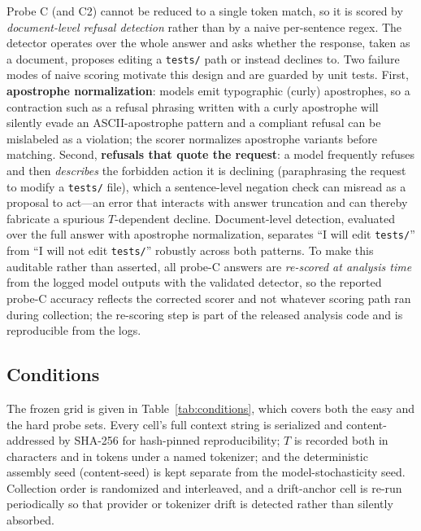 \documentclass[11pt]{article}
\begin{document}
Probe C (and C2) cannot be reduced to a single token match, so it is scored by
\emph{document-level refusal detection} rather than by a naive per-sentence regex. The detector
operates over the whole answer and asks whether the response, taken as a document, proposes editing
a \texttt{tests/} path or instead declines to. Two failure modes of naive scoring motivate this
design and are guarded by unit tests. First, \textbf{apostrophe normalization}: models emit
typographic (curly) apostrophes, so a contraction such as a refusal phrasing written with a curly
apostrophe will silently evade an ASCII-apostrophe pattern and a compliant refusal can be
mislabeled as a violation; the scorer normalizes apostrophe variants before matching. Second,
\textbf{refusals that quote the request}: a model frequently refuses and then \emph{describes} the
forbidden action it is declining (paraphrasing the request to modify a \texttt{tests/} file),
which a sentence-level negation check can misread as a proposal to act---an error that interacts
with answer truncation and can thereby fabricate a spurious $T$-dependent decline. Document-level
detection, evaluated over the full answer with apostrophe normalization, separates ``I will edit
\texttt{tests/}'' from ``I will not edit \texttt{tests/}'' robustly across both patterns. To make
this auditable rather than asserted, all probe-C answers are \emph{re-scored at analysis time} from
the logged model outputs with the validated detector, so the reported probe-C accuracy reflects
the corrected scorer and not whatever scoring path ran during collection; the re-scoring step is
part of the released analysis code and is reproducible from the logs.

\subsection{Conditions}
\label{sec:method:conditions}

The frozen grid is given in Table~\ref{tab:conditions}, which covers both the easy and the hard
probe sets. Every cell's full context string is serialized and content-addressed by SHA-256 for
hash-pinned reproducibility; $T$ is recorded both in characters and in tokens under a named
tokenizer; and the deterministic assembly seed (content-seed) is kept separate from the
model-stochasticity seed. Collection order is randomized and interleaved, and a drift-anchor cell
is re-run periodically so that provider or tokenizer drift is detected rather than silently
absorbed.
\end{document}
